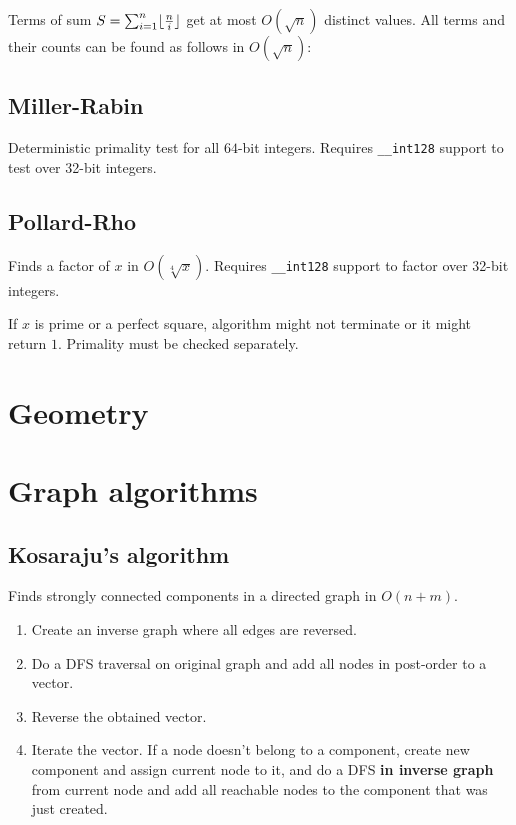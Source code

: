 \documentclass{article}
\DeclarePairedDelimiter\floor{\lfloor}{\rfloor} %
\begin{document}
Terms of sum $S = \sum_{i=1}^{n} \floor{\frac{n}{i}}$ get at most $O(\sqrt{n})$ distinct values. All terms and their counts can be found as follows in $O(\sqrt{n})$:



\subsection {Miller-Rabin}

Deterministic primality test for all $64$-bit integers. Requires \verb|__int128| support to test over 32-bit integers.



\subsection {Pollard-Rho}

Finds a factor of $x$ in $O(\sqrt[4]{x})$. Requires \verb|__int128| support to factor over 32-bit integers.

If $x$ is prime or a perfect square, algorithm might not terminate or it might return $1$. Primality must be checked separately.



\section {Geometry}



\section {Graph algorithms}

\subsection {Kosaraju's algorithm}

Finds strongly connected components in a directed graph in $O(n + m)$.

\begin{enumerate}
	\item Create an inverse graph where all edges are reversed.
	\item Do a DFS traversal on original graph and add all nodes in post-order to a vector.
	\item Reverse the obtained vector.
	\item Iterate the vector. If a node doesn't belong to a component, create new component and assign current node to it, and do a DFS \textbf{in inverse graph} from current node and add all reachable nodes to the component that was just created.
\end{enumerate}
\end{document}

